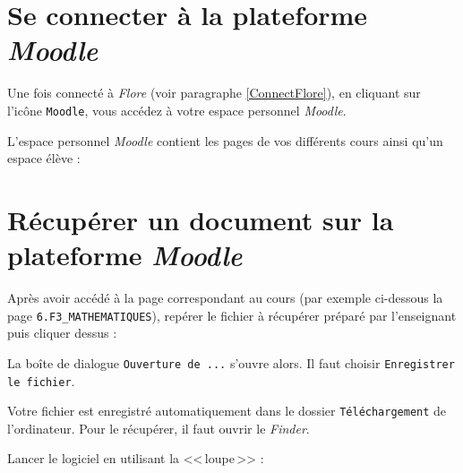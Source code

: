 








\section{Se connecter à la plateforme \emph{Moodle}}

Une fois connecté à \emph{Flore} (voir paragraphe \vref{ConnectFlore}), en cliquant sur l'icône \texttt{Moodle}, vous accédez à votre espace personnel \emph{Moodle}.


L'espace personnel \emph{Moodle} contient les pages de vos différents cours ainsi qu'un espace élève :







\section{Récupérer un document sur la plateforme \emph{Moodle}}\label{MoodlePrendreDoc}

Après avoir accédé à la page correspondant au cours (par exemple ci-dessous la page \texttt{6.F3\_MATHEMATIQUES}), repérer le fichier à récupérer préparé par l'enseignant puis cliquer dessus :


La boîte de dialogue \texttt{Ouverture de ...} s'ouvre alors. Il faut choisir \texttt{Enregistrer le fichier}.


Votre fichier est enregistré automatiquement dans le dossier \texttt{Téléchargement} de l'ordinateur. Pour le récupérer, il faut ouvrir le \emph{Finder}.

Lancer le logiciel en utilisant la <<\,loupe\,>> :



